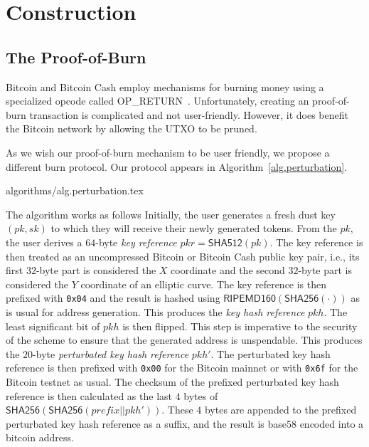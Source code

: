 \section{Construction}

\subsection{The Proof-of-Burn}
Bitcoin and Bitcoin Cash employ mechanisms for burning money using a specialized
opcode called \textsf{OP\_RETURN}~\cite{bartoletti2017analysis}. Unfortunately,
creating an  proof-of-burn transaction is complicated and not
user-friendly. However, it does benefit the Bitcoin network by allowing the UTXO
to be pruned.

As we wish our proof-of-burn mechanism to be user friendly, we propose a
different burn protocol. Our protocol appears in
Algorithm~\ref{alg.perturbation}.

{algorithms/alg.perturbation.tex}

The algorithm works as follows Initially, the user generates a fresh dust key
$(pk, sk)$ to which they will receive their newly generated tokens.  From the $pk$, the user derives a $64$-byte
\emph{key reference} $pkr = \textsf{SHA512}(pk)$. The key reference is then
treated as an uncompressed Bitcoin or Bitcoin Cash public key pair, i.e., its
first $32$-byte part is considered the $X$ coordinate and the second $32$-byte
part is considered the $Y$ coordinate of an elliptic curve. The key reference is
then prefixed with \texttt{0x04} and the result is hashed using
$\textsf{RIPEMD160}(\textsf{SHA256}(\cdot))$ as is usual for address generation.
This produces the \emph{key hash reference} $pkh$. The least significant bit of
$pkh$ is then flipped. This step is imperative to the security of the scheme to
ensure that the generated address is unspendable. This produces the $20$-byte
\emph{perturbated key hash reference} $pkh'$. The perturbated key hash reference
is then prefixed with \texttt{0x00} for the Bitcoin mainnet or with
\texttt{0x6f} for the Bitcoin testnet as usual. The checksum of the prefixed
perturbated key hash reference is then calculated as the last $4$ bytes of
$\textsf{SHA256}(\textsf{SHA256}(prefix || pkh'))$. These $4$ bytes are appended
to the prefixed perturbated key hash reference as a suffix, and the result is
\textsf{base58} encoded into a bitcoin address.

